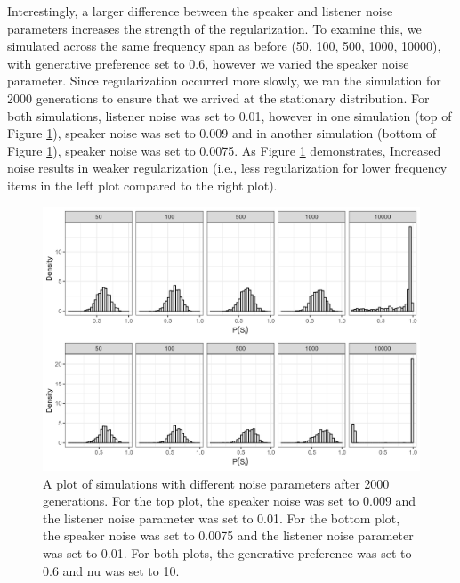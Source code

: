 \documentclass[10pt, letterpaper]{article}
\newenvironment{CodeChunk}{}{}
\begin{document}
Interestingly, a larger difference between the speaker and listener
noise parameters increases the strength of the regularization. To
examine this, we simulated across the same frequency span as before (50,
100, 500, 1000, 10000), with generative preference set to 0.6, however
we varied the speaker noise parameter. Since regularization occurred
more slowly, we ran the simulation for 2000 generations to ensure that
we arrived at the stationary distribution. For both simulations,
listener noise was set to 0.01, however in one simulation (top of Figure
\ref{fig:fasterslowerreg}), speaker noise was set to 0.009 and in
another simulation (bottom of Figure \ref{fig:fasterslowerreg}), speaker
noise was set to 0.0075. As Figure \ref{fig:fasterslowerreg}
demonstrates, Increased noise results in weaker regularization (i.e.,
less regularization for lower frequency items in the left plot compared
to the right plot).

\begin{CodeChunk}
\begin{figure}[tb]

{\centering \includegraphics[width=1\linewidth]{Figures/fasterSlowerReg} 

}

\caption[A plot of simulations with different noise parameters after 2000 generations]{A plot of simulations with different noise parameters after 2000 generations. For the top plot, the speaker noise was set to 0.009 and the listener noise parameter was set to 0.01. For the bottom plot, the speaker noise was set to 0.0075 and the listener noise parameter was set to 0.01. For both plots, the generative preference was set to 0.6 and nu was set to 10.}\label{fig:fasterslowerreg}
\end{figure}
\end{CodeChunk}
\end{document}
